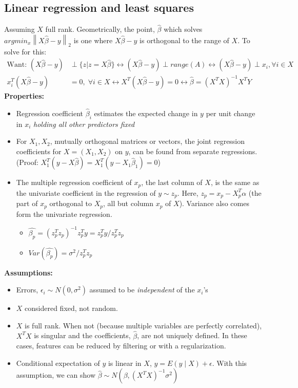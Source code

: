 \documentclass{article}
\newcommand{\norm}[2]{\left\lVert#1\right\rVert_#2}
\begin{document}
\subsection{Linear regression and least squares}
Assuming $X$ full rank. Geometrically, the point, $\hat{\beta}$ which solves $argmin_x\norm{X\hat{\beta} - y}{2}$ is one where $X\hat{\beta} - y$ is orthogonal to the range of $X$. To solve for this:
\begin{align*}
    \textrm{Want: } (X\hat{\beta} - y) &\perp \{z \vert z = X\hat{\beta}\} \longleftrightarrow (X\hat{\beta} - y) \perp range(A) \longleftrightarrow (X\hat{\beta} - y) \perp x_i, \forall i \in X\\
    x_i^T(X\hat{\beta} - y) &= 0, \; \forall i \in X \longleftrightarrow X^T(X\hat{\beta} - y) = 0 \longleftrightarrow \hat{\beta} = (X^TX)^{-1}X^TY
\end{align*}
\textbf{Properties:}
\begin{itemize}
  \item Regression coefficient $\hat{\beta}_i$ estimates the expected change in $y$ per unit change in $x_i$ \textit{holding all other predictors fixed}
  \item For $X_1, X_2$, mutually orthogonal matrices or vectors, the joint regression coefficients for $X = (X_1, X_2)$ on $y$, can be found from separate regressions. (Proof: $X_1^T(y - X\hat{\beta}) = X_1^T(y - X_1\hat{\beta}_1) = 0$)
  \item The multiple regression coefficient of $x_p$, the last column of $X$, is the same as the univariate coefficient in the regression of $y \sim z_p$. Here, $z_p = x_p - X_p^T\alpha$ (the part of $x_p$ orthogonal to $X_p$, all but column $x_p$ of $X$). Variance also comes form the univariate regression.
  \begin{itemize}
    \item $\hat{\beta_p} = (z_p^Tz_p)^{-1}z_p^Ty = z_p^Ty / z_p^Tz_p$
    \item $Var(\hat{\beta_p}) = \sigma^2 / z_p^Tz_p$
  \end{itemize}
\end{itemize}
\textbf{Assumptions:}
\begin{itemize}
  \item Errors, $\epsilon_i \sim N(0, \sigma^2)$ assumed to be \textit{independent} of the $x_i$'s
  \item $X$ considered fixed, not random. 
  \item $X$ is full rank. When not (because multiple variables are perfectly correlated), $X^TX$ is singular and the coefficients, $\hat{\beta}$, are not uniquely defined. In these cases, features can be reduced by filtering or with a regularization.
  \item Conditional expectation of $y$ is linear in $X$, $y = E(y \mid X) + \epsilon$. With this assumption, we can show $\hat{\beta} \sim N(\beta, (X^TX)^{-1}\sigma^2)$
\end{itemize}
\end{document}
